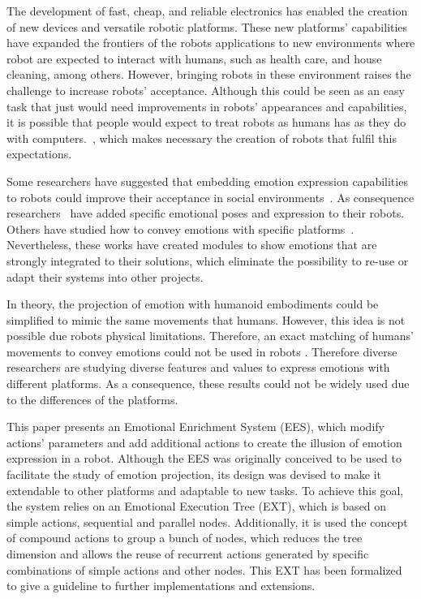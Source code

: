 The development of fast, cheap, and reliable electronics has enabled the creation of new devices and versatile robotic platforms. These new platforms' capabilities have expanded the frontiers of the robots applications  to new environments where robot are expected to interact with humans, such as health care, and house cleaning, among others. However, bringing robots in these environment raises the challenge to increase robots' acceptance. Although this could be seen as an easy task that just would need improvements in robots' appearances and capabilities, it is possible that people would expect to treat robots as humans has  as they do with computers.~\cite{Reeves1996}, which makes necessary the creation of robots that fulfil this expectations.

Some researchers have suggested that embedding emotion expression capabilities to robots could improve their acceptance in social environments~\cite{Pavia2014}. As consequence researchers~\cite{Breazeal2002,Arras2012} have added specific emotional poses and expression to their robots. Others have studied how to convey emotions with specific platforms~\cite{Li2011,Brown2014}. Nevertheless, these works have created modules to show emotions that are strongly integrated to their solutions, which eliminate the possibility to re-use or adapt their systems into other projects.

In theory, the projection of emotion with humanoid embodiments could be simplified to mimic the same movements that humans. However, this idea is not possible due robots physical limitations. Therefore, an exact matching of humans' movements to convey emotions could not be used in robots \cite{Saerbeck2007,Canamero2010}. Therefore diverse researchers are studying diverse features and values to express emotions with different platforms. As a consequence, these results could not be widely used due to the differences of the platforms.

This paper presents an Emotional Enrichment System (EES), which modify actions' parameters and add additional actions to create the illusion of emotion expression in a robot. Although the EES was originally conceived to be used to facilitate the study of emotion projection, its design was devised to make it extendable to other platforms and adaptable to new tasks. To achieve this goal, the system relies on an Emotional Execution Tree (EXT), which is based on simple actions, sequential and parallel nodes. Additionally, it is used the concept of compound actions to group a bunch of nodes, which reduces the tree dimension and allows the reuse of recurrent actions  generated by specific combinations of simple actions and other nodes. This EXT has been formalized to give a guideline to further implementations and extensions.
 
